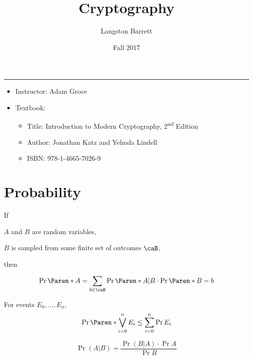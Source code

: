 \documentclass[a5paper]{article}
\begin{document}
\title{Cryptography}
\author{Langston Barrett}
\date{Fall 2017}
\maketitle
\tableofcontents
\vspace{1em}
\hrule
\vspace{1em}

\begin{itemize}
  \item Instructor: Adam Groce
  \item Textbook:
    \begin{itemize}
      \item Title: Introduction to Modern Cryptography, 2\textsuperscript{nd} Edition
      \item Author: Jonathan Katz and Yehuda Lindell
      \item ISBN: 978-1-4665-7026-9
    \end{itemize}
\end{itemize}

\section{Probability}
\label{sec:probability}

\begin{lemma}
  If
  \begin{premises}
    \item $A$ and $B$ are random variables,
    \item $B$ is sampled from some finite set of outcomes $\caB$,
  \end{premises}
  then
  \begin{conclusion}
    \begin{equation*}
      \Pr\paren{A}=\sum_{b\in \caB}\Pr\paren{A|B}\cdot\Pr\paren{B=b}
    \end{equation*}
  \end{conclusion}
\end{lemma}

\begin{lemma}
  For events $E_0,\ldots,E_n$,
  \begin{equation*}
    \Pr\paren{\bigvee_{i=0}^n E_i} \leq \sum_{i=0}^n\Pr E_i
  \end{equation*}
\end{lemma}

\begin{theorem}
  \begin{equation*}
    \Pr(A|B) = \frac{\Pr(B|A)\cdot \Pr A}{\Pr B}
  \end{equation*}
\end{theorem}
\end{document}
